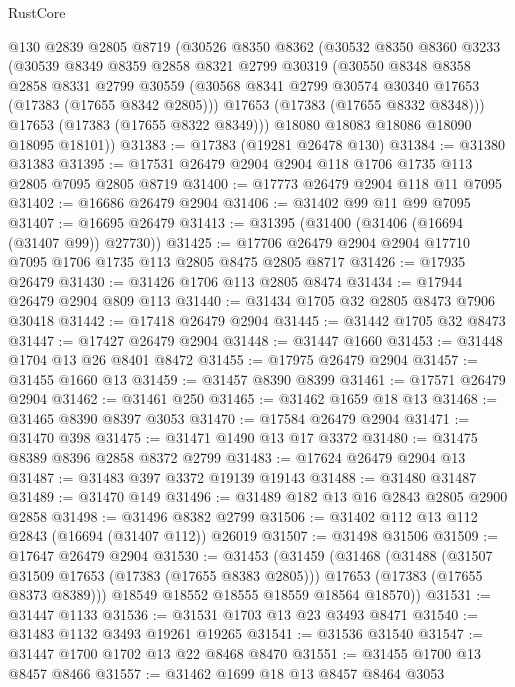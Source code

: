 \begin{lexlean}{RustCore}
\begin{coremodule}
    @130
    @2839
    @2805
    @8719
    (@30526
      @8350
      @8362
      (@30532
        @8350
        @8360
        @3233
        (@30539
          @8349
          @8359
          @2858
          @8321
          @2799
          @30319
          (@30550
            @8348
            @8358
            @2858
            @8331
            @2799
            @30559
            (@30568 @8341 @2799 @30574 @30340 @17653 (@17383 (@17655 @8342 @2805)))
            @17653
            (@17383 (@17655 @8332 @8348)))
          @17653
          (@17383 (@17655 @8322 @8349)))
        @18080
        @18083
        @18086
        @18090
        @18095
        @18101))
@31383 := @17383 (@19281 @26478 @130)
@31384 := @31380 @31383
@31395 := @17531 @26479 @2904 @2904 @118 @1706 @1735 @113 @2805 @7095 @2805 @8719
@31400 := @17773 @26479 @2904 @118 @11 @7095
@31402 := @16686 @26479 @2904
@31406 := @31402 @99 @11 @99 @7095
@31407 := @16695 @26479
@31413 := @31395 (@31400 (@31406 (@16694 (@31407 @99)) @27730))
@31425 := @17706 @26479 @2904 @2904 @17710 @7095 @1706 @1735 @113 @2805 @8475 @2805 @8717
@31426 := @17935 @26479
@31430 := @31426 @1706 @113 @2805 @8474
@31434 := @17944 @26479 @2904 @809 @113
@31440 := @31434 @1705 @32 @2805 @8473 @7906 @30418
@31442 := @17418 @26479 @2904
@31445 := @31442 @1705 @32 @8473
@31447 := @17427 @26479 @2904
@31448 := @31447 @1660
@31453 := @31448 @1704 @13 @26 @8401 @8472
@31455 := @17975 @26479 @2904
@31457 := @31455 @1660 @13
@31459 := @31457 @8390 @8399
@31461 := @17571 @26479 @2904
@31462 := @31461 @250
@31465 := @31462 @1659 @18 @13
@31468 := @31465 @8390 @8397 @3053
@31470 := @17584 @26479 @2904
@31471 := @31470 @398
@31475 := @31471 @1490 @13 @17 @3372
@31480 := @31475 @8389 @8396 @2858 @8372 @2799
@31483 := @17624 @26479 @2904 @13
@31487 := @31483 @397 @3372 @19139 @19143
@31488 := @31480 @31487
@31489 := @31470 @149
@31496 := @31489 @182 @13 @16 @2843 @2805 @2900 @2858
@31498 := @31496 @8382 @2799
@31506 := @31402 @112 @13 @112 @2843 (@16694 (@31407 @112)) @26019
@31507 := @31498 @31506
@31509 := @17647 @26479 @2904
@31530 := @31453
    (@31459
      (@31468
        (@31488
          (@31507 @31509 @17653 (@17383 (@17655 @8383 @2805)))
          @17653
          (@17383 (@17655 @8373 @8389)))
        @18549
        @18552
        @18555
        @18559
        @18564
        @18570))
@31531 := @31447 @1133
@31536 := @31531 @1703 @13 @23 @3493 @8471
@31540 := @31483 @1132 @3493 @19261 @19265
@31541 := @31536 @31540
@31547 := @31447 @1700 @1702 @13 @22 @8468 @8470
@31551 := @31455 @1700 @13 @8457 @8466
@31557 := @31462 @1699 @18 @13 @8457 @8464 @3053

\end{coremodule}
\end{lexlean}
